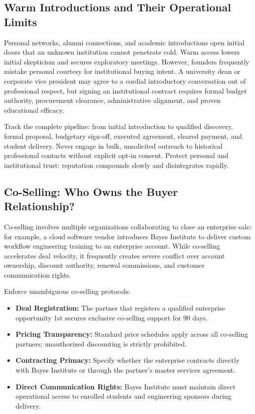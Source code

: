 \subsection{Warm Introductions and Their Operational Limits}
\label{sec:warm_introductions_and_limits}

Personal networks, alumni connections, and academic introductions open initial doors that an unknown institution cannot penetrate cold. Warm access lowers initial skepticism and secures exploratory meetings. However, founders frequently mistake personal courtesy for institutional buying intent. A university dean or corporate vice president may agree to a cordial introductory conversation out of professional respect, but signing an institutional contract requires formal budget authority, procurement clearance, administrative alignment, and proven educational efficacy.

Track the complete pipeline: from initial introduction to qualified discovery, formal proposal, budgetary sign-off, executed agreement, cleared payment, and student delivery. Never engage in bulk, unsolicited outreach to historical professional contacts without explicit opt-in consent. Protect personal and institutional trust: reputation compounds slowly and disintegrates rapidly.

\subsection{Co-Selling: Who Owns the Buyer Relationship?}
\label{sec:co_selling_relationship_ownership}

Co-selling involves multiple organizations collaborating to close an enterprise sale: for example, a cloud software vendor introduces Bayes Institute to deliver custom workflow engineering training to an enterprise account. While co-selling accelerates deal velocity, it frequently creates severe conflict over account ownership, discount authority, renewal commissions, and customer communication rights.

Enforce unambiguous co-selling protocols:
\begin{itemize}
\item \textbf{Deal Registration:} The partner that registers a qualified enterprise opportunity 1st secures exclusive co-selling support for 90 days.
\item \textbf{Pricing Transparency:} Standard price schedules apply across all co-selling partners; unauthorized discounting is strictly prohibited.
\item \textbf{Contracting Primacy:} Specify whether the enterprise contracts directly with Bayes Institute or through the partner's master services agreement.
\item \textbf{Direct Communication Rights:} Bayes Institute must maintain direct operational access to enrolled students and engineering sponsors during delivery.
\end{itemize}

